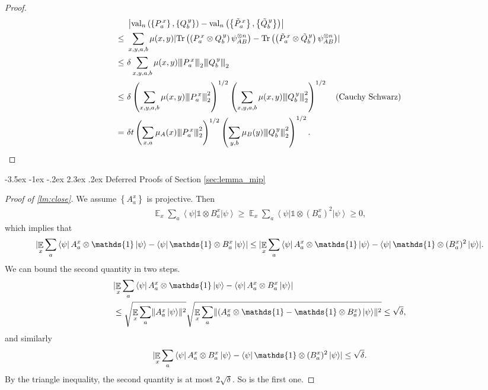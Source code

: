 \documentclass[11pt]{article}
\makeatletter
\renewcommand{\section}{\@startsection {section}{1}{\z@}%
             {-3.5ex \@plus -1ex \@minus -.2ex}%
             {2.3ex \@plus .2ex}%
             {\normalfont\Large\scshape\bfseries}}
\theoremstyle{plain}
\theoremstyle{definition}
\newcommand {\set} [1] {\ensuremath{ \left\lbrace #1 \right\rbrace }}
\newcommand {\br} [1] {\ensuremath{ \left( #1 \right) }}
\DeclarePairedDelimiter{\norm}{\lVert}{\rVert}
\newcommand {\ab} [1] {\ensuremath{ \left| #1 \right| }}
\DeclarePairedDelimiter{\abs}{\lvert}{\rvert}
\newcommand {\bra} [1] {\ensuremath{ \left\langle #1 \right| }}
\newcommand {\ket} [1] {\ensuremath{ \left| #1 \right\rangle }}
\DeclareMathOperator*{\bigE}{\mathbb{E}}
\newcommand{\nnorm}[1]{{\left\vert\kern-0.25ex\left\vert\kern-0.25ex\left\vert #1
		\right\vert\kern-0.25ex\right\vert\kern-0.25ex\right\vert}}
\newcommand {\Tr} {\ensuremath{ \mathrm{Tr} }}
\newcommand {\id} {\ensuremath{\mathds{1}}}
\newcommand{\gval}[3]{\ensuremath{\mathrm{val}_{#1}\br{\set{#2},\set{#3}}}}
\newcommand{\Pss} {\ensuremath{P^{\,x}_a}}
\newcommand{\Qss} {\ensuremath{Q^{\,y}_b}}
\newcommand{\Pwss} {\ensuremath{\tilde{P}^{\,x}_a}}
\newcommand{\Qwss} {\ensuremath{\tilde{Q}^{\,y}_b}}
\newcommand{\x}{\otimes}
\newcommand{\1}{\mathbb{1}} %
\makeatother
\begin{document}
\begin{proof}
\begin{align*}
&\ab{\gval{n}{\Pss}{\Qss}-\gval{n}{\Pwss}{\Qwss}}\\
\leq~&\sum_{x,y,a,b}\mu(x,y)\abs{\Tr\br{\br{\Pss\otimes \Qss}\psi_{AB}^{\otimes n}}-\Tr\br{\br{\Pwss\otimes \Qwss}\psi_{AB}^{\otimes n}}}\\
\leq~&\delta\sum_{x,y,a,b}\mu(x,y)\nnorm{\Pss}_2\nnorm{\Qss}_2\\
\leq~&\delta\br{\sum_{x,y,a,b}\mu(x,y)\nnorm{\Pss}_2^2}^{1/2}\br{\sum_{x,y,a,b}\mu(x,y)\nnorm{\Qss}_2^2}^{1/2}\quad\mbox{(Cauchy Schwarz)}\\
=~&\delta t\br{\sum_{x,a}\mu_A(x)\nnorm{\Pss}_2^2}^{1/2}\br{\sum_{y,b}\mu_B(y)\nnorm{\Qss}_2^2}^{1/2}.
\end{align*}
\end{proof}


%
\section{Deferred Proofs of Section \ref{sec:lemma_mip}}
\label{sec:ans}
\begin{proof}[Proof of \cref{lm:close}]
    We assume $\set{A^x_a}$ is projective. Then 
	\begin{align*}
		\bigE_x \sum_a \bra{\psi} \id \x B^x_a \ket{\psi} \geq \bigE_x \sum_a \bra{\psi} \id \x (B^x_a)^2  \ket{\psi} \geq 0,
	\end{align*}
	which implies that 
	\begin{align*}
		\abs{ \bigE_x \sum_a \bra{\psi} A^x_a \x \id \ket{\psi} -\bra{\psi} \id\x B^x_a \ket{\psi}} \leq 
		\abs{ \bigE_x \sum_a \bra{\psi} A^x_a \x \id \ket{\psi} -\bra{\psi} \id\x (B^x_a)^2 \ket{\psi}}.
	\end{align*}
	We can bound the second quantity in two steps.
	\begin{align*}
		&\abs{ \bigE_x \sum_a \bra{\psi} A^x_a\x \id \ket{\psi} - \bra{\psi} A^x_a \x B^x_a \ket{\psi}} \\
		&\leq \sqrt{\bigE_x \sum_a \norm{ A^x_a\ket{\psi}}^2} \sqrt{ \bigE_x \sum_a \norm{ (A^x_a \x \id - \id\x B^x_a)\ket{\psi}}^2} \leq \sqrt{\delta},
	\end{align*}
	and similarly
	\begin{align*}
		\abs{ \bigE_x \sum_a \bra{\psi} A^x_a\x B^x_a \ket{\psi} - \bra{\psi} \id \x (B^x_a)^2 \ket{\psi}} \leq \sqrt{\delta}.
	\end{align*}
        By the triangle inequality, the second quantity is at most $2\sqrt{\delta}$. So is the first one.
\end{proof}
\end{document}
